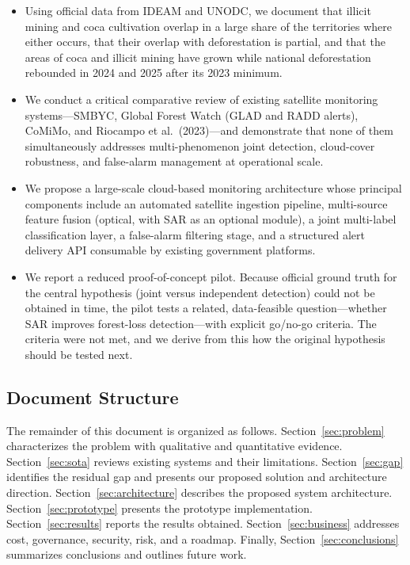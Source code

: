\documentclass{article}
\begin{document}
\begin{itemize}
    \item Using official data from IDEAM and UNODC, we document that illicit
    mining and coca cultivation overlap in a large share of the territories where
    either occurs, that their overlap with deforestation is partial, and that the
    areas of coca and illicit mining have grown while national deforestation
    rebounded in 2024 and 2025 after its 2023 minimum.
    \item We conduct a critical comparative review of existing satellite monitoring
    systems---SMBYC, Global Forest Watch (GLAD and RADD alerts), CoMiMo, and Riocampo et al.\ (2023)---and demonstrate that none of them simultaneously addresses
    multi-phenomenon joint detection, cloud-cover robustness, and false-alarm
    management at operational scale.
    \item We propose a large-scale cloud-based monitoring architecture whose
    principal components include an automated satellite ingestion pipeline,
    multi-source feature fusion (optical, with SAR as an optional module), a joint multi-label
    classification layer, a false-alarm filtering stage, and a structured
    alert delivery API consumable by existing government platforms.
    \item We report a reduced proof-of-concept pilot. Because official
    ground truth for the central hypothesis (joint versus independent detection)
    could not be obtained in time, the pilot tests a related, data-feasible
    question---whether SAR improves forest-loss detection---with explicit
    go/no-go criteria. The criteria were not met, and we derive from this how
    the original hypothesis should be tested next.
\end{itemize}

\subsection{Document Structure}

The remainder of this document is organized as follows.
Section~\ref{sec:problem} characterizes the problem with qualitative and
quantitative evidence.
Section~\ref{sec:sota} reviews existing systems and their limitations.
Section~\ref{sec:gap} identifies the residual gap and presents our proposed
solution and architecture direction.
Section~\ref{sec:architecture} describes the proposed system architecture.
Section~\ref{sec:prototype} presents the prototype implementation.
Section~\ref{sec:results} reports the results obtained.
Section~\ref{sec:business} addresses cost, governance, security, risk, and a
roadmap.
Finally, Section~\ref{sec:conclusions} summarizes conclusions and outlines
future work.
\end{document}
